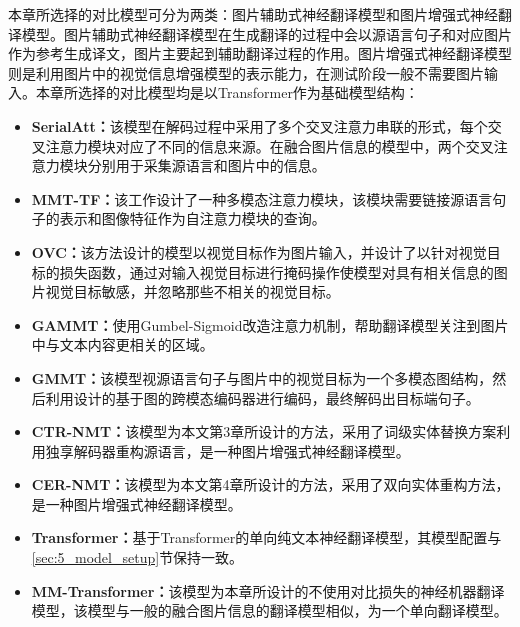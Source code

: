 本章所选择的对比模型可分为两类：图片辅助式神经翻译模型和图片增强式神经翻译模型。图片辅助式神经翻译模型在生成翻译的过程中会以源语言句子和对应图片作为参考生成译文，图片主要起到辅助翻译过程的作用。图片增强式神经翻译模型则是利用图片中的视觉信息增强模型的表示能力，在测试阶段一般不需要图片输入。本章所选择的对比模型均是以Transformer作为基础模型结构：
\begin{itemize}
    \item \textbf{SerialAtt\cite{47_DBLP:conf/wmt/LibovickyHM18}：}该模型在解码过程中采用了多个交叉注意力串联的形式，每个交叉注意力模块对应了不同的信息来源。在融合图片信息的模型中，两个交叉注意力模块分别用于采集源语言和图片中的信息。
    \item \textbf{MMT-TF\cite{40_yao-wan-2020-multimodal}：}该工作设计了一种多模态注意力模块，该模块需要链接源语言句子的表示和图像特征作为自注意力模块的查询。
    \item \textbf{OVC\cite{48_DBLP:conf/aaai/WangX21}：}该方法设计的模型以视觉目标作为图片输入，并设计了以针对视觉目标的损失函数，通过对输入视觉目标进行掩码操作使模型对具有相关信息的图片视觉目标敏感，并忽略那些不相关的视觉目标。
    \item \textbf{GAMMT\cite{41_DBLP:journals/corr/abs-2103-08862}：}使用Gumbel-Sigmoid改造注意力机制，帮助翻译模型关注到图片中与文本内容更相关的区域。
    \item \textbf{GMMT\cite{33_yin-etal-2020-novel}：}该模型视源语言句子与图片中的视觉目标为一个多模态图结构，然后利用设计的基于图的跨模态编码器进行编码，最终解码出目标端句子。
    \item \textbf{CTR-NMT：}该模型为本文第3章所设计的方法，采用了词级实体替换方案利用独享解码器重构源语言，是一种图片增强式神经翻译模型。
    \item \textbf{CER-NMT：}该模型为本文第4章所设计的方法，采用了双向实体重构方法，是一种图片增强式神经翻译模型。
    \item \textbf{Transformer：}基于Transformer的单向纯文本神经翻译模型，其模型配置与\ref{sec:5_model_setup}节保持一致。
    \item \textbf{MM-Transformer：}该模型为本章所设计的不使用对比损失的神经机器翻译模型，该模型与一般的融合图片信息的翻译模型相似，为一个单向翻译模型。
    
\end{itemize}
